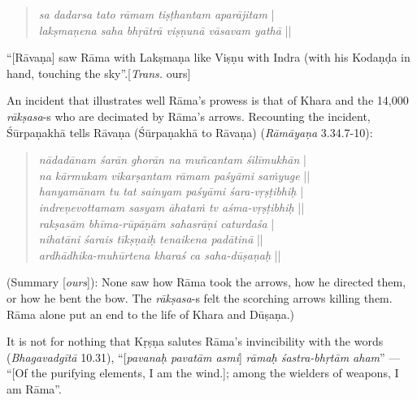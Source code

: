 \begin{quote}
{{\sl sa dadarsa tato rāmam tiṣṭhantam aparājitam}}\label{verse44} |\\
{\sl lakṣmaṇena saha bhṛātrā viṣṇunā vāsavam yathā} || 
\end{quote}

\begin{myquote}
“[Rāvaṇa] saw Rāma with Lakṣmaṇa like Viṣṇu with Indra (with his Kodaṇḍa in hand, touching the sky”.\hfill [{\sl Trans.} ours]
\end{myquote}

An incident that illustrates well Rāma’s prowess is that of Khara and the 14,000 {\sl rākṣasa}-s who are decimated by Rāma’s arrows. Recounting the incident, Śūrpaṇakhā tells Rāvaṇa (Śūrpaṇakhā to Rāvaṇa) ({\sl Rāmāyaṇa} 3.34.7-10): 
\begin{quote}
{{\sl nādadānam śarān ghorān na muñcantam śilīmukhān}}\label{verse36} |\\
{\sl na kārmukam vikarṣantam rāmam paśyāmi saṁyuge} ||\\
{\sl hanyamānam tu tat sainyam paśyāmi śara-vṛṣṭibhiḥ}\label{verse37} |\\
{\sl indreṇevottamam sasyam āhataṁ tv aśma-vṛṣṭibhiḥ} ||\\
{\sl rakṣasām bhīma-rūpāṇām sahasrāṇi caturdaśa}\label{verse38} |\\
{\sl nihatāni śarais tīkṣṇaiḥ tenaikena padātinā} ||\\
{\sl ardhādhika-muhūrtena kharaś ca saha-dūṣaṇaḥ}\label{verse39} ||
\end{quote}

\begin{myquote}
(Summary [{\sl ours}]): None saw how Rāma took the arrows, how he directed them, or how he bent the bow. The {\sl rākṣasa}-s felt the scorching arrows killing them. Rāma alone put an end to the life of Khara and Dūṣaṇa.)  
\end{myquote}

It is not for nothing that Kṛṣṇa salutes Rāma’s invincibility with the words ({\sl Bhagavadgītā} 10.31), “[{\sl pavanaḥ pavatām asmi}] {\sl rāmaḥ śastra-bhṛtām aham}” --- “[Of the purifying elements, I am the wind.]; among the wielders of weapons, I am Rāma”. 

